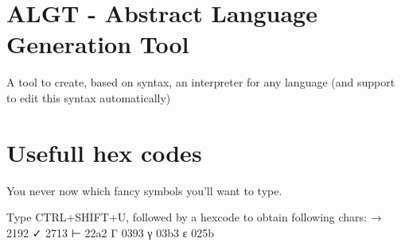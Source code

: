 \section{ALGT - Abstract Language Generation
Tool}\label{algt---abstract-language-generation-tool}

A tool to create, based on syntax, an interpreter for any language (and
support to edit this syntax automatically)

\section{Usefull hex codes}\label{usefull-hex-codes}

You never now which fancy symbols you'll want to type.

Type CTRL+SHIFT+U, followed by a hexcode to obtain following chars: →
2192 ✓ 2713 ⊢ 22a2 Γ 0393 γ 03b3 ɛ 025b
